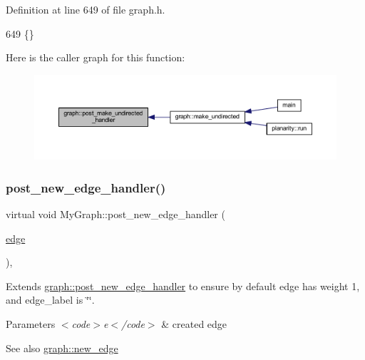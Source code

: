 Definition at line 649 of file graph.\+h.


\begin{DoxyCode}
649 \{\}
\end{DoxyCode}
Here is the caller graph for this function\+:
\nopagebreak
\begin{figure}[H]
\begin{center}
\leavevmode
\includegraphics[width=350pt]{classgraph_a3d2bc348d12931aff1d2e97a6b4285c3_icgraph}
\end{center}
\end{figure}
\mbox{\label{class_my_graph_a7d8f03bae7c6a731718385ae4e546d98}} 
\subsubsection{\texorpdfstring{post\+\_\+new\+\_\+edge\+\_\+handler()}{post\_new\_edge\_handler()}}
{\footnotesize\ttfamily virtual void My\+Graph\+::post\+\_\+new\+\_\+edge\+\_\+handler (\begin{DoxyParamCaption}\item[{\mbox{\hyperlink{classedge}{edge}}}]{ }\end{DoxyParamCaption})\hspace{0.3cm}{\ttfamily [inline]}, {\ttfamily [virtual]}}

Extends \mbox{\hyperlink{classgraph_a443182426b461aa9f4b1c9f5ac535179}{graph\+::post\+\_\+new\+\_\+edge\+\_\+handler}} to ensure by default edge has weight 1, and edge\+\_\+label is \char`\"{}\char`\"{}.


\begin{DoxyParams}{Parameters}
{\em $<$code$>$e$<$/code$>$} & created edge \\
\hline
\end{DoxyParams}
\begin{DoxySeeAlso}{See also}
\mbox{\hyperlink{classgraph_a02a0c3a219f75d68caa408ef339d4a1c}{graph\+::new\+\_\+edge}} 
\end{DoxySeeAlso}


